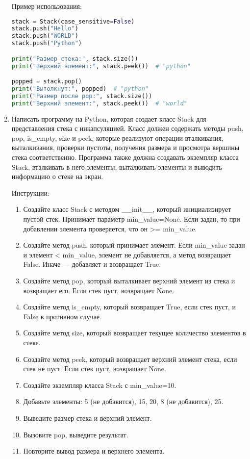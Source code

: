 \begin{enumerate}
Пример использования:
\begin{lstlisting}[language=Python]
stack = Stack(case_sensitive=False)
stack.push("Hello")
stack.push("WORLD")
stack.push("Python")

print("Размер стека:", stack.size())
print("Верхний элемент:", stack.peek())  # "python"

popped = stack.pop()
print("Вытолкнут:", popped)  # "python"
print("Размер после pop:", stack.size())
print("Верхний элемент:", stack.peek())  # "world"
\end{lstlisting}

\item Написать программу на Python, которая создает класс Stack для представления стека с инкапсуляцией. Класс должен содержать методы push, pop, is\_empty, size и peek, которые реализуют операции вталкивания, выталкивания, проверки пустоты, получения размера и просмотра вершины стека соответственно. Программа также должна создавать экземпляр класса Stack, вталкивать в него элементы, выталкивать элементы и выводить информацию о стеке на экран.

Инструкции:
\begin{enumerate}
    \item Создайте класс Stack с методом \_\_init\_\_, который инициализирует пустой стек. Принимает параметр min\_value=None. Если задан, то при добавлении элемента проверяется, что он >= min\_value.
    \item Создайте метод push, который принимает элемент. Если min\_value задан и элемент < min\_value, элемент не добавляется, а метод возвращает False. Иначе — добавляет и возвращает True.
    \item Создайте метод pop, который выталкивает верхний элемент из стека и возвращает его. Если стек пуст, возвращает None.
    \item Создайте метод is\_empty, который возвращает True, если стек пуст, и False в противном случае.
    \item Создайте метод size, который возвращает текущее количество элементов в стеке.
    \item Создайте метод peek, который возвращает верхний элемент стека, если стек не пуст. Если стек пуст, возвращает None.
    \item Создайте экземпляр класса Stack с min\_value=10.
    \item Добавьте элементы: 5 (не добавится), 15, 20, 8 (не добавится), 25.
    \item Выведите размер стека и верхний элемент.
    \item Вызовите pop, выведите результат.
    \item Повторите вывод размера и верхнего элемента.
\end{enumerate}


\end{enumerate}
